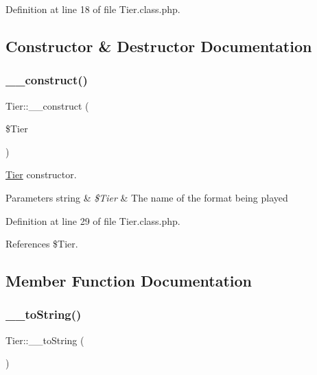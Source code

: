 Definition at line 18 of file Tier.\+class.\+php.



\subsection{Constructor \& Destructor Documentation}
\mbox{\label{class_tier_ac4cf20e52416a2045bbe2d613f3b4b2d}} 
\subsubsection{\texorpdfstring{\+\_\+\+\_\+construct()}{\_\_construct()}}
{\footnotesize\ttfamily Tier\+::\+\_\+\+\_\+construct (\begin{DoxyParamCaption}\item[{}]{\$\+Tier }\end{DoxyParamCaption})}

\hyperlink{class_tier}{Tier} constructor. 
\begin{DoxyParams}[1]{Parameters}
string & {\em \$\+Tier} & The name of the format being played \\
\hline
\end{DoxyParams}


Definition at line 29 of file Tier.\+class.\+php.



References \$\+Tier.



\subsection{Member Function Documentation}
\mbox{\label{class_tier_af7e66c68ef60ef2b529f91a3a8d6327a}} 
\subsubsection{\texorpdfstring{\+\_\+\+\_\+to\+String()}{\_\_toString()}}
{\footnotesize\ttfamily Tier\+::\+\_\+\+\_\+to\+String (\begin{DoxyParamCaption}{ }\end{DoxyParamCaption})}



